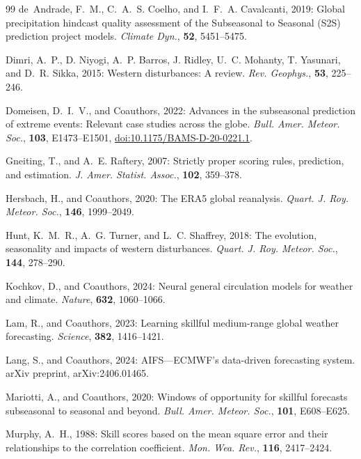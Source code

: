 \documentclass[11pt,a4paper]{article}
\providecommand{\doi}[1]{\href{https://doi.org/#1}{doi:#1}}
\begin{document}
\begin{thebibliography}{99}
de~Andrade, F.~M., C.~A.~S. Coelho, and I.~F.~A. Cavalcanti, 2019:
Global precipitation hindcast quality assessment of the Subseasonal
to Seasonal (S2S) prediction project models. \textit{Climate Dyn.},
\textbf{52}, 5451--5475.

Dimri, A.~P., D. Niyogi, A.~P. Barros, J. Ridley, U.~C. Mohanty,
T. Yasunari, and D.~R. Sikka, 2015: Western disturbances: A review.
\textit{Rev. Geophys.}, \textbf{53}, 225--246.

Domeisen, D.~I.~V., and Coauthors, 2022: Advances in the subseasonal
prediction of extreme events: Relevant case studies across the globe.
\textit{Bull. Amer. Meteor. Soc.}, \textbf{103}, E1473--E1501,
\doi{10.1175/BAMS-D-20-0221.1}.

Gneiting, T., and A.~E. Raftery, 2007: Strictly proper scoring rules,
prediction, and estimation. \textit{J. Amer. Statist. Assoc.},
\textbf{102}, 359--378.

Hersbach, H., and Coauthors, 2020: The ERA5 global reanalysis.
\textit{Quart. J. Roy. Meteor. Soc.}, \textbf{146}, 1999--2049.

Hunt, K.~M.~R., A.~G. Turner, and L.~C. Shaffrey, 2018: The evolution,
seasonality and impacts of western disturbances. \textit{Quart. J.
Roy. Meteor. Soc.}, \textbf{144}, 278--290.

Kochkov, D., and Coauthors, 2024: Neural general circulation models
for weather and climate. \textit{Nature}, \textbf{632}, 1060--1066.

Lam, R., and Coauthors, 2023: Learning skillful medium-range global
weather forecasting. \textit{Science}, \textbf{382}, 1416--1421.

Lang, S., and Coauthors, 2024: AIFS---ECMWF's data-driven forecasting
system. arXiv preprint, arXiv:2406.01465.

Mariotti, A., and Coauthors, 2020: Windows of opportunity for skillful
forecasts subseasonal to seasonal and beyond. \textit{Bull. Amer.
Meteor. Soc.}, \textbf{101}, E608--E625.

Murphy, A.~H., 1988: Skill scores based on the mean square error and
their relationships to the correlation coefficient. \textit{Mon. Wea.
Rev.}, \textbf{116}, 2417--2424.


\end{thebibliography}
\end{document}
